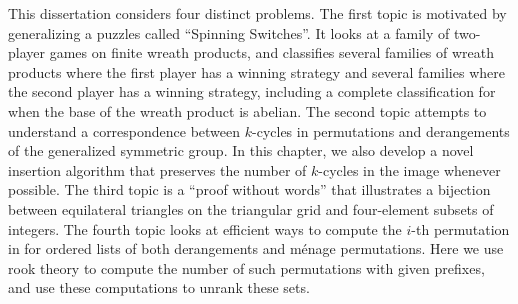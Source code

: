 This dissertation considers four distinct problems.
The first topic is motivated by generalizing a puzzles called
``Spinning Switches''. It looks at a family of two-player games on finite wreath
products, and classifies several families of wreath products where
the first player has a winning strategy and several families where the
second player has a winning strategy, including a complete classification
for when the base of the wreath product is abelian.
The second topic attempts to understand a correspondence between
$k$-cycles in permutations and derangements of the generalized symmetric
group. In this chapter, we also develop a novel insertion algorithm that
preserves the number of $k$-cycles in the image whenever possible.
The third topic is a ``proof without words'' that illustrates a bijection
between equilateral triangles on the triangular grid and four-element subsets
of integers.
The fourth topic looks at efficient ways to compute the $i$-th permutation
in for ordered lists of both derangements and m\'enage permutations. Here
we use rook theory to compute the number of such permutations with given
prefixes, and use these computations to unrank these sets.
